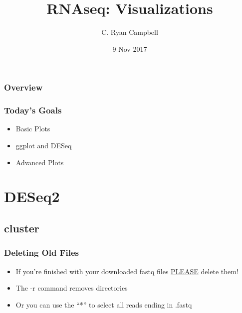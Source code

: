 \documentclass[14pt,handout]{beamer}
\title[RNA Viz]{RNAseq: Visualizations} %
\author{C. Ryan Campbell} %
\institute[Duke] %
{
Duke University \\ %
\medskip
\textit{c.ryan.campbell@duke.edu} %
}
\date{9 Nov 2017} %
\begin{document}
\begin{frame}
\titlepage %
\end{frame}

\begin{frame}
\frametitle{Overview} %
\tableofcontents %
\end{frame}


\begin{frame}
\frametitle{Today's Goals}
\begin{itemize}
	\item<+-> Basic Plots
	\item<+-> ggplot and DESeq
	\item<+-> Advanced Plots
\end{itemize}
\end{frame}

\section{DESeq2}

\subsection{cluster}

\begin{frame}
\frametitle{Deleting Old Files}
\begin{itemize}
	\item If you're finished with your downloaded fastq files \underline{PLEASE} delete them!
	\footnotesize
	\ttfamily
	\sffamily
	\normalsize
	\item The -r command removes directories
	\item Or you can use the ``*'' to select all reads ending in .fastq
\end{itemize}
\end{frame}
\end{document}
